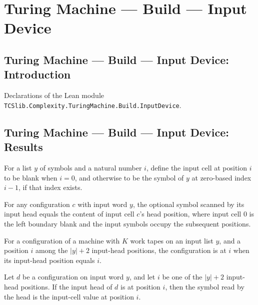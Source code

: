 \section{Turing Machine --- Build --- Input Device}
\subsection*{Turing Machine --- Build --- Input Device: Introduction}

Declarations of the Lean module \texttt{TCSlib.Complexity.TuringMachine.Build.InputDevice}.

\subsection*{Turing Machine --- Build --- Input Device: Results}

\begin{definition}
\label{Turing.inputCell}
\leanok
For a list $y$ of symbols and a natural number $i$, define the input cell at position
$i$ to be blank when $i=0$, and otherwise to be the symbol of $y$ at zero-based index
$i-1$, if that index exists.
\end{definition}

\begin{theorem}
\label{Turing.Cfg.inputSymbol_eq_inputCell}
\leanok
{}
For any configuration $c$ with input word $y$, the optional symbol scanned by its input
head equals the content of input cell $c$'s head position, where input cell $0$ is the
left boundary blank and the input symbols occupy the subsequent positions.
\end{theorem}

\begin{definition}
\label{Turing.NativeAt}
\leanok
{}
For a configuration of a machine with $K$ work tapes on an input list $y$, and a
position $i$ among the $|y|+2$ input-head positions, the configuration is at $i$ when
its input-head position equals $i$.
\end{definition}

\begin{theorem}
\label{Turing.NativeAt.inputSymbol_eq}
\leanok
{}
Let $d$ be a configuration on input word $y$, and let $i$ be one of the $|y|+2$
input-head positions. If the input head of $d$ is at position $i$, then the symbol read
by the head is the input-cell value at position $i$.
\end{theorem}

